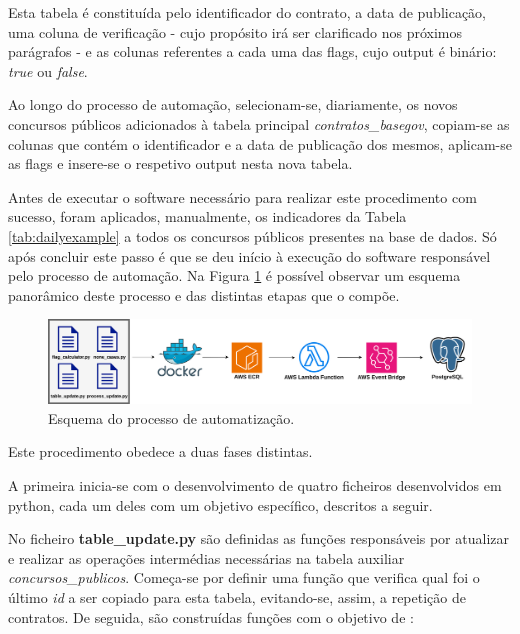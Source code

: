 Esta tabela é constituída pelo identificador do contrato, a data de publicação, uma coluna de verificação - cujo propósito irá ser clarificado nos próximos parágrafos - e as colunas referentes a cada uma das flags, cujo output é binário: \textit{true} ou \textit{false}. 


Ao longo do processo de automação, selecionam-se, diariamente, os novos concursos públicos adicionados à tabela principal \textit{contratos\_basegov}, copiam-se as colunas que contém o identificador e a data de publicação dos mesmos, aplicam-se as flags e insere-se o respetivo output nesta nova tabela. 


Antes de executar o software necessário para realizar este procedimento com sucesso, foram aplicados, manualmente, os indicadores da Tabela \ref{tab:dailyexample} a todos os concursos públicos presentes na base de dados. Só após concluir este passo é que se deu início à execução do software responsável pelo processo de automação. Na Figura \ref{fig:esquema} é possível observar um esquema panorâmico deste processo e das distintas etapas que o compõe.  


\begin{figure}[H]
	\centering
	\includegraphics[width=\textwidth]{imagens/daily_flags_v2.png}
	\caption{Esquema do processo de automatização.}
	\label{fig:esquema}
\end{figure}


Este procedimento obedece a duas fases distintas. 

A primeira inicia-se com o desenvolvimento de quatro ficheiros desenvolvidos em python, cada um deles com um objetivo específico, descritos a seguir. 

No ficheiro \textbf{table\_update.py} são definidas as funções responsáveis por atualizar e realizar as operações intermédias necessárias na tabela auxiliar \textit{concursos\_publicos}. Começa-se por definir uma função que verifica qual foi o último \textit{id} a ser copiado para esta tabela, evitando-se, assim, a repetição de contratos. De seguida, são construídas funções com o objetivo de :

